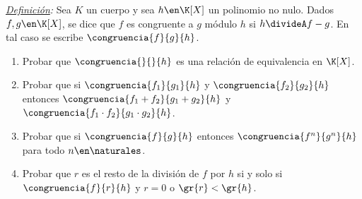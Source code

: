 \ejercicio

\textit{\underline {Definición}:} Sea $K$ un cuerpo y sea $h \en \K[X]$ un polinomio no nulo. Dados $f,g \en \K[X]$,
se dice que $f$ es congruente a $g$ módulo $h$ si $h \divideA f-g$. En tal caso se escribe $\congruencia{f}{g}{h}$.

\begin{enumerate}[label=\roman*)]
	\item Probar que $\congruencia{}{}{h}$ es una relación de equivalencia en $\K[X]$.

	\item Probar que si $\congruencia{f_1}{g_1}{h}$ y $\congruencia{f_2}{g_2}{h}$ entonces $\congruencia{f_1 + f_2}{g_1 + g_2}{h}$ y
	      $\congruencia{f_1 \cdot f_2}{ g_1 \cdot g_2}{h}$.

	\item Probar que si $\congruencia{f}{g}{h}$ entonces $\congruencia{f^n}{g^n}{h}$ para todo $n \en \naturales$.

	\item Probar que $r$ es el resto de la división de $f$ por $h$ si y solo si $\congruencia{f}{r}{h}$ y $r=0$ o $\gr{r} < \gr{h}$.
\end{enumerate}

\separadorCorto

